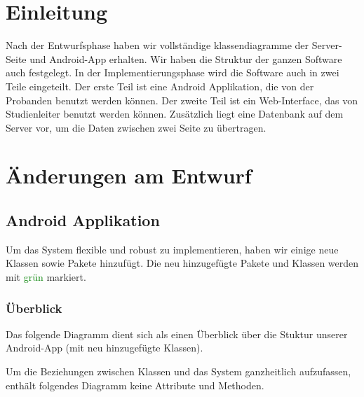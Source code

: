 \documentclass[a4paper]{scrreprt}
\begin{document}
    \tableofcontents

    \chapter{Einleitung}

        Nach der Entwurfsphase haben wir vollständige klassendiagramme der Server-Seite und Android-App erhalten. Wir haben die Struktur der ganzen Software auch festgelegt. In der Implementierungsphase wird die Software auch in zwei Teile eingeteilt. Der erste Teil ist eine Android Applikation, die von der Probanden benutzt werden können. Der zweite Teil ist ein Web-Interface, das von Studienleiter benutzt werden können. Zusätzlich liegt eine Datenbank auf dem Server vor, um die Daten zwischen zwei Seite zu übertragen.





    \newpage
    \chapter{Änderungen am Entwurf}


        \section{Android Applikation}

            Um das System flexible und robust zu implementieren, haben wir einige neue Klassen sowie Pakete hinzufügt. Die neu hinzugefügte Pakete und Klassen werden mit \textcolor{green}{grün} markiert.

            \subsection{Überblick}

            Das folgende Diagramm dient sich als einen Überblick über die Stuktur unserer Android-App (mit neu hinzugefügte Klassen). 

            \noindent Um die Beziehungen zwischen Klassen und das System ganzheitlich aufzufassen, enthält folgendes Diagramm keine Attribute und Methoden.
\end{document}
